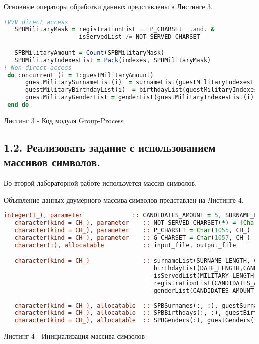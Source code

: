 \documentclass[12pt, a4paper]{report}
\begin{document}
Основные операторы обработки данных представлены в Листинге 3.
\begin{lstlisting}[language=Fortran]
!VVV direct access
   SPBMilitaryMask = registrationList == P_CHARSEt  .and. &
                     isServedList /= NOT_SERVED_CHARSET

   SPBMilitaryAmount = Count(SPBMilitaryMask)
   SPBMilitaryIndexesList = Pack(indexes, SPBMilitaryMask)
! Non direct access
 do concurrent (i = 1:guestMilitaryAmount)
      guestMilitarySurnameList(i)  = surnameList(guestMilitaryIndexesList(i))
      guestMilitaryBirthdayList(i)  = birthdayList(guestMilitaryIndexesList(i))
      guestMilitaryGenderList = genderList(guestMilitaryIndexesList(i))
 end do
\end{lstlisting}
\begin{center}
Листинг 3 - Код модуля Group-Process
\end{center}
\newpage

\begin{center}
\subsection*{1.2. Реализовать задание с использованием массивов символов.}
\end{center}

Во второй лабораторной работе используется массив символов.

Объявление данных двумерного массива символов представлен на Листинге 4.
\begin{lstlisting}[language=Fortran]
integer(I_), parameter              :: CANDIDATES_AMOUNT = 5, SURNAME_LENGTH = 15, DATE_LENGTH = 4, MILITARY_LENGTH = 3
   character(kind = CH_), parameter    :: NOT_SERVED_CHARSET(*) = [Char(1053, CH_), Char(1077, CH_), Char(1090, CH_)]
   character(kind = CH_), parameter    :: P_CHARSET = Char(1055, CH_)
   character(kind = CH_), parameter    :: G_CHARSET = Char(1057, CH_)
   character(:), allocatable           :: input_file, output_file

   character(kind = CH_)               :: surnameList(SURNAME_LENGTH, CANDIDATES_AMOUNT)  = "", &
                                          birthdayList(DATE_LENGTH,CANDIDATES_AMOUNT) = "", &
                                          isServedList(MILITARY_LENGTH,CANDIDATES_AMOUNT)  = "",&
                                          registrationList(CANDIDATES_AMOUNT) = "", &
                                          genderList(CANDIDATES_AMOUNT) = ""
                           
   character(kind = CH_), allocatable  :: SPBSurnames(:, :), guestSurnames(:, :)
   character(kind = CH_), allocatable  :: SPBBirthdays(:, :), guestBirthdays(:, :)
   character(kind = CH_), allocatable  :: SPBGenders(:), guestGenders(:)
\end{lstlisting}
\begin{center}
Листинг 4 - Инициализация массива символов
\end{center}
\end{document}
